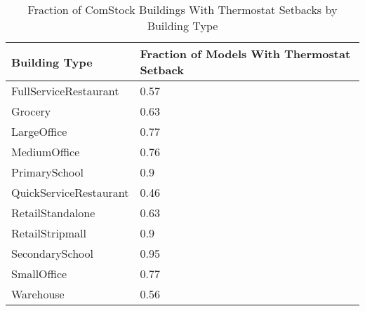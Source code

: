\begin{table}
\centering
\small
\caption[Fraction of ComStock Buildings with Thermostat Setbacks]{Fraction of ComStock Buildings With Thermostat Setbacks by Building Type}
\label{tab:thermostat_setback_prev}
\begin{tabular}{|l|l|}
\hline
\textbf{Building Type}          & \textbf{Fraction of Models With Thermostat Setback} \\ \hline
FullServiceRestaurant  & 0.57                                                \\ \hline
Grocery  & 0.63                                                \\ \hline
LargeOffice            & 0.77                                                \\ \hline
MediumOffice           & 0.76                                                \\ \hline
PrimarySchool          & 0.9                                                 \\ \hline
QuickServiceRestaurant & 0.46                                                \\ \hline
RetailStandalone       & 0.63                                                \\ \hline
RetailStripmall        & 0.9                                                 \\ \hline
SecondarySchool        & 0.95                                                \\ \hline
SmallOffice            & 0.77                                                \\ \hline
Warehouse              & 0.56                                                \\ \hline
\end{tabular}
\end{table}
